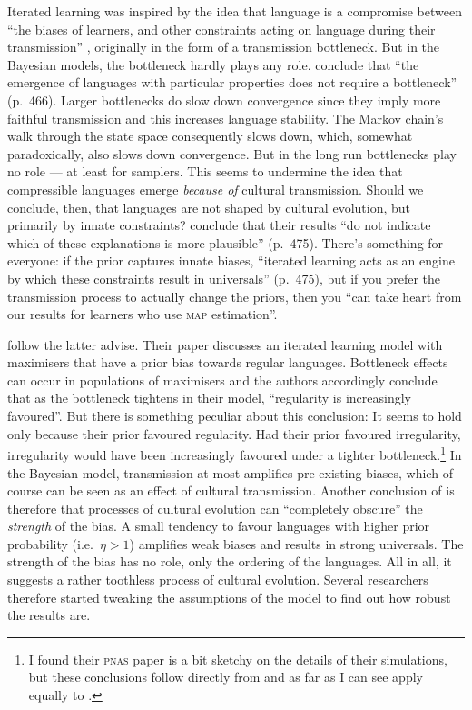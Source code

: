 \documentclass{../src/bcthesispart}
\begin{document}
Iterated learning was inspired by the idea that language is a compromise between “the biases of learners, and other constraints acting on language during their transmission” \parencite{Smith2009}, originally in the form of a transmission bottleneck.
But in the Bayesian models, the bottleneck hardly plays any role.
\textcite{Griffiths2007a} conclude that “the emergence of languages with particular properties does not require a bottleneck” (p.~466).
Larger bottlenecks do slow down convergence since they imply more faithful transmission and this increases language stability.
The Markov chain’s walk through the state space consequently slows down, which, somewhat paradoxically, also slows down convergence. 
But in the long run bottlenecks play no role — at least for samplers.
This seems to undermine the idea that compressible languages emerge \emph{because of} cultural transmission.
Should we conclude, then, that languages are not shaped by cultural evolution, but primarily by innate constraints?
\textcite{Griffiths2007a} conclude that their results “do not indicate which of these explanations is more plausible” (p.~475).
There’s something for everyone: if the prior captures innate biases, “iterated learning acts as an engine by which these constraints result in universals” (p.~475), but if you prefer the transmission process to actually change the priors, then you “can take heart from our results for learners who use \textsc{map} estimation”.





\textcite{Kirby2007} follow the latter advise. 
Their paper discusses an iterated learning model with maximisers that have a prior bias towards regular languages.
Bottleneck effects can occur in populations of maximisers \parencite{Griffiths2007a} and the authors accordingly conclude that as the bottleneck tightens in their model, “regularity is increasingly favoured”. 
But there is something peculiar about this conclusion: 
It seems to hold only because their prior favoured regularity.
Had their prior favoured irregularity, irregularity would have been increasingly favoured under a tighter bottleneck.\footnote{%
	I found their \textsc{pnas} paper is a bit sketchy on the details of their simulations, but these conclusions follow directly from \textcite{Griffiths2007a} and as far as I can see apply equally to \textcite{Kirby2007}.
	}
In the Bayesian model, transmission at most amplifies pre-existing biases, which of course can be seen as an effect of cultural transmission. 
Another conclusion of \textcite{Kirby2007} is therefore that processes of cultural evolution can “completely obscure” the \emph{strength} of the bias.
A small tendency to favour languages with higher prior probability (i.e.\ $\eta>1$) amplifies weak biases and results in strong universals. 
The strength of the bias has no role, only the ordering of the languages.
All in all, it suggests a rather toothless process of cultural evolution.
Several researchers therefore started tweaking the assumptions of the model to find out how robust the results are.
\end{document}
